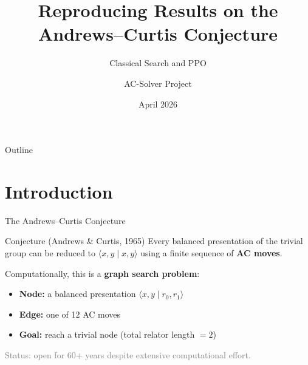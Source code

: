 \documentclass[aspectratio=169,11pt]{beamer}
\title{Reproducing Results on the\\Andrews--Curtis Conjecture}
\subtitle{Classical Search and PPO}
\author{AC-Solver Project}
\date{April 2026}
\newcommand{\pres}[2]{\langle #1 \mid #2 \rangle}
\begin{document}
\maketitle

\begin{frame}{Outline}
  \tableofcontents
\end{frame}

\section{Introduction}

\begin{frame}{The Andrews--Curtis Conjecture}
  \begin{block}{Conjecture (Andrews \& Curtis, 1965)}
    Every balanced presentation of the trivial group can be reduced to $\pres{x,y}{x,y}$
    using a finite sequence of \textbf{AC moves}.
  \end{block}

  \bigskip

  Computationally, this is a \textbf{graph search problem}:
  \begin{itemize}
    \item \textbf{Node:} a balanced presentation $\pres{x,y}{r_0, r_1}$
    \item \textbf{Edge:} one of 12 AC moves
    \item \textbf{Goal:} reach a trivial node (total relator length $= 2$)
  \end{itemize}

  \bigskip
  \textcolor{gray}{Status: open for 60+ years despite extensive computational effort.}
\end{frame}
\end{document}
